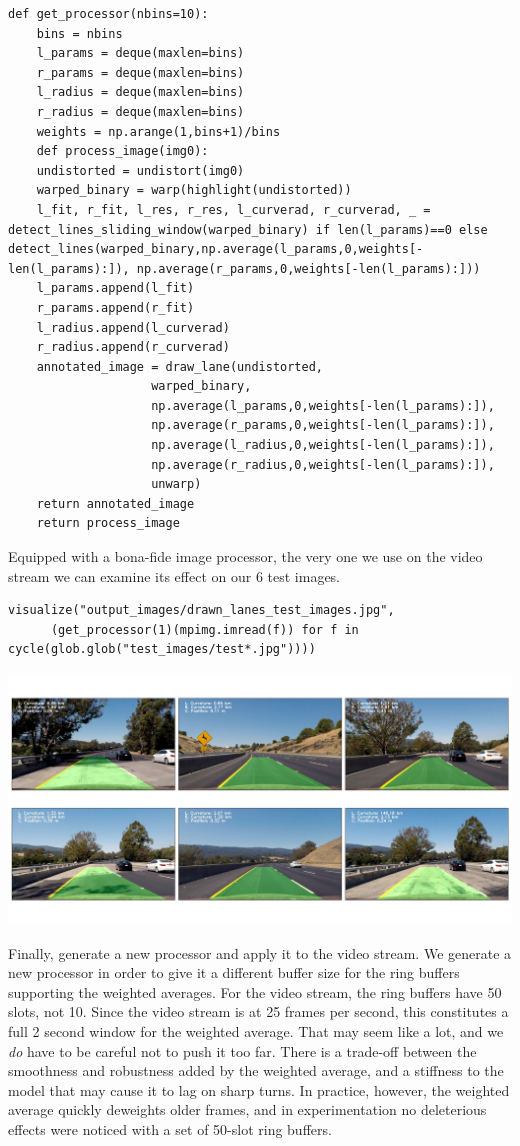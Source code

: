 \documentclass[11pt]{article}
\begin{document}
\begin{verbatim}
def get_processor(nbins=10):
    bins = nbins
    l_params = deque(maxlen=bins)
    r_params = deque(maxlen=bins)
    l_radius = deque(maxlen=bins)
    r_radius = deque(maxlen=bins)
    weights = np.arange(1,bins+1)/bins
    def process_image(img0):
	undistorted = undistort(img0)
	warped_binary = warp(highlight(undistorted))
	l_fit, r_fit, l_res, r_res, l_curverad, r_curverad, _ = detect_lines_sliding_window(warped_binary) if len(l_params)==0 else detect_lines(warped_binary,np.average(l_params,0,weights[-len(l_params):]), np.average(r_params,0,weights[-len(l_params):]))
	l_params.append(l_fit)
	r_params.append(r_fit)
	l_radius.append(l_curverad)
	r_radius.append(r_curverad)
	annotated_image = draw_lane(undistorted,
				    warped_binary,
				    np.average(l_params,0,weights[-len(l_params):]),
				    np.average(r_params,0,weights[-len(l_params):]),
				    np.average(l_radius,0,weights[-len(l_params):]),
				    np.average(r_radius,0,weights[-len(l_params):]),
				    unwarp)
	return annotated_image
    return process_image
\end{verbatim}

Equipped with a bona-fide image processor, the very one we use
on the video stream we can examine its effect on our 6 test images.

\begin{verbatim}
visualize("output_images/drawn_lanes_test_images.jpg", 
	  (get_processor(1)(mpimg.imread(f)) for f in cycle(glob.glob("test_images/test*.jpg"))))
\end{verbatim}

\includegraphics[width=.9\linewidth]{output_images/drawn_lanes_test_images.jpg}

Finally, generate a new processor and apply it to the video
stream.  We generate a new processor in order to give it a
different buffer size for the ring buffers supporting the
weighted averages.  For the video stream, the ring buffers have
50 slots, not 10.  Since the video stream is at 25 frames per
second, this constitutes a full 2 second window for the weighted
average.  That may seem like a lot, and we \emph{do} have to be
careful not to push it too far.  There is a trade-off between
the smoothness and robustness added by the weighted average, and
a stiffness to the model that may cause it to lag on sharp
turns.  In practice, however, the weighted average quickly
deweights older frames, and in experimentation no deleterious
effects were noticed with a set of 50-slot ring buffers.
\end{document}
